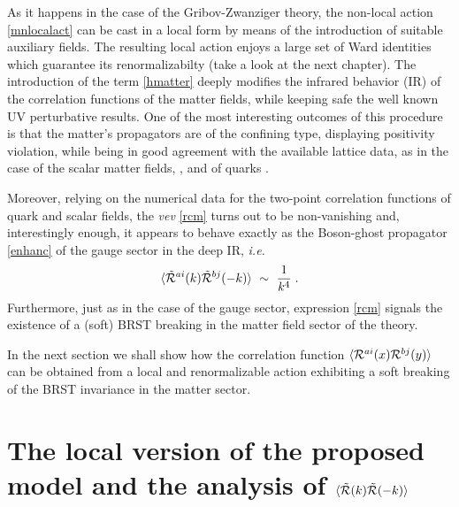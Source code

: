 As it happens in the case of the Gribov-Zwanziger theory, the non-local action
\eqref{mnlocalact} can be cast in a local form by means of the introduction of suitable
auxiliary fields. The resulting local action enjoys a large set of Ward identities which
guarantee its renormalizabilty (take a look at the next chapter). The introduction of the term \eqref{hmatter} deeply modifies
the infrared behavior (IR) of the correlation functions of the matter fields, while keeping
safe the well known UV perturbative results. One of the most interesting outcomes of this
procedure is that the matter's propagators are of the confining type, displaying positivity
violation, while being in good agreement with the available lattice data, as in the case of the
scalar matter fields, \cite{Maas:2011yx,Maas:2010nc}, and of quarks
\cite{Furui:2006ks,Parappilly:2005ei}.

Moreover, relying on the numerical data for the two-point correlation functions of quark and
scalar fields, the \emph{vev} \eqref{rcm} turns out to be non-vanishing and, interestingly
enough, it appears to behave exactly as the Boson-ghost propagator \eqref{enhanc} of the gauge
sector in the  deep IR, \emph{i.e.}
\begin{equation} 
 \langle {\tilde {\cal R}} ^{ai}(k)  {\tilde {\cal R}}^{bj}(-k)  \rangle  ~\sim~ \frac{1}{k^4}
\;. 
\label{menhanc}
\end{equation} 
Furthermore, just as in the case of the gauge sector, expression \eqref{rcm} signals the
existence of a (soft) BRST breaking in the matter field sector of the theory.


In the next section we shall show how the correlation function $\langle {\cal R}^{ai}(x) {\cal R}^{bj}(y)  \rangle $ can be obtained from a local and renormalizable action exhibiting a soft breaking of the BRST invariance in the matter sector.






\section{The local version of the proposed model and the analysis of $\langle {\tilde
{\cal R}}(k) {\tilde {\cal R}}(-k) \rangle$}
\label{localhorizoninmatter}

